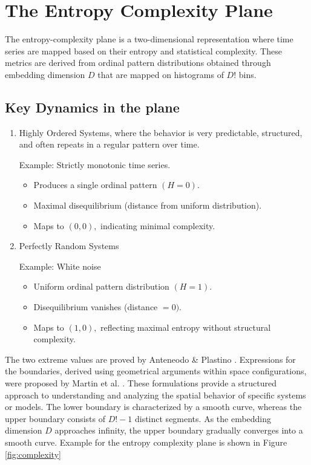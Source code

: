 \section{The Entropy Complexity Plane} \label{Sec:EntropyComplexity}
The entropy-complexity plane is a two-dimensional representation where time series are mapped based on their entropy and statistical complexity. These metrics are derived from ordinal pattern distributions obtained through embedding dimension $D$ that are mapped on histograms of $D!$ bins. 


\subsection{Key Dynamics in the plane}
\begin{enumerate}
	\item Highly Ordered Systems, where the behavior is very predictable, structured, and often repeats in a regular pattern over time.
	
	Example: Strictly monotonic time series.
	\begin{itemize}
		\item Produces a single ordinal pattern $(H=0)$.
		
		\item Maximal disequilibrium (distance from uniform distribution).
		
		\item Maps to $(0,0),$ indicating minimal complexity.
	\end{itemize}
	
	\item Perfectly Random Systems
	
	Example: White noise
	\begin{itemize}
		\item Uniform ordinal pattern distribution $(H=1)$.
		\item Disequilibrium vanishes (distance $=0)$.
		\item Maps to $(1,0),$ reflecting maximal entropy without structural complexity.
	\end{itemize}
\end{enumerate}
The two extreme values are proved by Anteneodo \& Plastino \cite{anteneodo1996some}.
Expressions for the boundaries, derived using geometrical arguments within space configurations, were proposed by Martin et al. \cite{Martin2006}. 
These formulations provide a structured approach to understanding and analyzing the spatial behavior of specific systems or models. The lower boundary is characterized by a smooth curve, whereas the upper boundary consists of $D!-1$ distinct segments. As the embedding dimension $D$ approaches infinity, the upper boundary gradually converges into a smooth curve. 
Example for the entropy complexity plane is shown in Figure \ref{fig:complexity}

